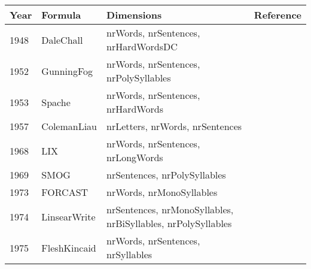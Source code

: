 \begin{tabular}{|l|l|p{65mm}|l|} \hline
\textbf{Year} & \textbf{Formula} & \textbf{Dimensions} & \textbf{Reference} \\ \hline
1948 & DaleChall & nrWords, nrSentences, nrHardWordsDC &  \\ \hline
1952 & GunningFog & nrWords, nrSentences, nrPolySyllables &  \\ \hline
1953 & Spache & nrWords, nrSentences, nrHardWords &  \\ \hline
1957 & ColemanLiau & nrLetters, nrWords, nrSentences &  \\ \hline
1968 & LIX & nrWords, nrSentences, nrLongWords &  \\ \hline
1969 & SMOG & nrSentences, nrPolySyllables &  \\ \hline
1973 & FORCAST & nrWords, nrMonoSyllables &  \\ \hline
1974 & LinsearWrite & nrSentences, nrMonoSyllables, nrBiSyllables, nrPolySyllables &  \\ \hline
1975 & FleshKincaid & nrWords, nrSentences, nrSyllables &  \\ \hline
\end{tabular}